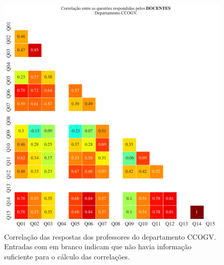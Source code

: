 \documentclass[a4paper,10pt]{article}
\begin{document}
\begin{figure}[h]
\centering
\includegraphics[width=0.999\linewidth]{matriz_corr__CCOGV_docentes.png}
\caption{\label{fig:corr_docentes}Correlação das respostas dos professores do departamento CCOGV. Entradas com em branco indicam que não havia informação suficiente para o cálculo das correlações.}
\end{figure}
\end{document}

